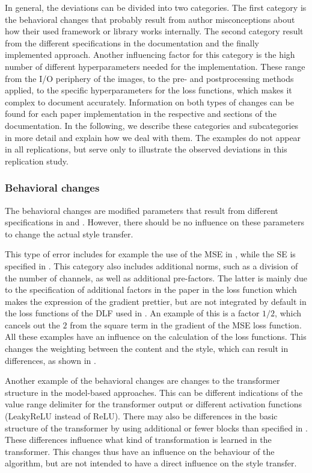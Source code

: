 In general, the deviations can be divided into two categories. The first category is the behavioral changes that probably result from author misconceptions about how their used framework or library works internally. The second category  result from the different specifications in the documentation and the finally implemented approach. Another influencing factor for this category is the high number of different hyperparameters needed for the implementation. These range from the I/O periphery of the images, to the pre- and postprocessing methods applied, to the specific hyperparameters for the loss functions, which makes it complex to document accurately. Information on both types of changes can be found for each paper implementation in the respective  and  sections of the documentation. In the following, we describe these categories and subcategories in more detail and explain how we deal with them. The examples do not appear in all replications, but serve only to illustrate the observed deviations in this replication study.

\subsubsection{Behavioral changes}
The behavioral changes are modified parameters that result from different specifications in \paper{} and \implementation{}. However, there should be no influence on these parameters to change the actual style transfer.  

This type of error includes for example the use of the \gls{MSE} in \implementation{}, while the \gls{SE} is specified in \paper{}. This category also includes additional norms, such as a division of the number of channels, as well as additional pre-factors. The latter is mainly due to the specification of additional factors in the paper in the loss function which makes the expression of the gradient prettier, but are not integrated by default in the loss functions of the \gls{DLF} used in \implementation{}. An example of this is a factor $1/2$, which cancels out the $2$ from the square term in the gradient of the \gls{MSE} loss function. All these examples have an influence on the calculation of the loss functions. This changes the weighting between the content and the style, which can result in differences, as shown in . 

Another example of the behavioral changes are changes to the transformer structure in the model-based approaches. This can be different indications of the value range delimiter for the transformer output or different activation functions (LeakyReLU instead of ReLU). There may also be differences in the basic structure of the transformer by using additional or fewer blocks than specified in \paper{}. These differences influence what kind of transformation is learned in the transformer. This changes thus have an influence on the behaviour of the algorithm, but are not intended to have a direct influence on the style transfer.

